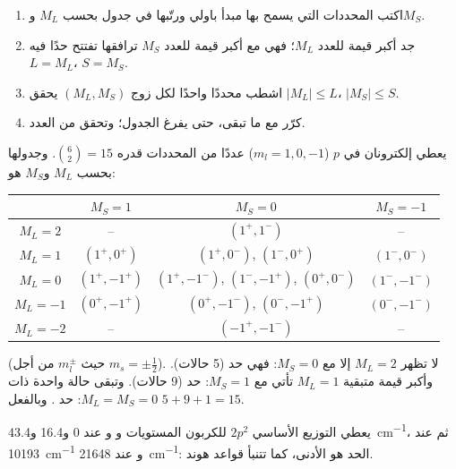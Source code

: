 \begin{method}\label{met:b3:many-electron-atoms:terms}
\begin{enumerate}
  \item اكتب المحددات التي يسمح بها مبدأ باولي ورتّبها
        في جدول بحسب $M_L$ و$M_S$.
  \item جد أكبر قيمة للعدد $M_L$؛ فهي مع أكبر قيمة للعدد $M_S$ ترافقها
        تفتتح حدًا فيه $L = M_L$، $S = M_S$.
  \item اشطب محددًا واحدًا لكل زوج $(M_L, M_S)$ يحقق
        $|M_L| \le L$، $|M_S| \le S$.
  \item كرّر مع ما تبقى، حتى يفرغ الجدول؛ وتحقق من العدد.
\end{enumerate}
\end{method}

\begin{example}[حدود $p^2$]\label{ex:b3:many-electron-atoms:p2}
يعطي إلكترونان في $p$ ($m_l = 1, 0, -1$) عددًا من المحددات قدره $\binom62 = 15$.
وجدولها بحسب $M_L$ و$M_S$ هو:
\begin{center}\small
\begin{tabular}{c|ccc}
\hline
 & $M_S = 1$ & $M_S = 0$ & $M_S = -1$\\ \hline
$M_L = 2$ & -- & $(1^+,1^-)$ & --\\
$M_L = 1$ & $(1^+,0^+)$ & $(1^+,0^-)$, $(1^-,0^+)$ & $(1^-,0^-)$\\
$M_L = 0$ & $(1^+,-1^+)$ & $(1^+,-1^-)$, $(1^-,-1^+)$, $(0^+,0^-)$ & $(1^-,-1^-)$\\
$M_L = -1$ & $(0^+,-1^+)$ & $(0^+,-1^-)$, $(0^-,-1^+)$ & $(0^-,-1^-)$\\
$M_L = -2$ & -- & $(-1^+,-1^-)$ & --\\ \hline
\end{tabular}
\end{center}
(حيث $m_l^\pm$ من أجل $m_s = \pm\frac12$). لا تظهر $M_L = 2$ إلا مع $M_S = 0$:
فهي حد  (5 حالات). وأكبر قيمة متبقية $M_L = 1$ تأتي مع
$M_S = 1$: حد  (9 حالات). وتبقى حالة واحدة ذات $M_L = M_S = 0$: حد
. وبالفعل $5 + 9 + 1 = 15$.
\end{example}

\begin{example}\label{ex:b3:many-electron-atoms:carbon}
يعطي التوزيع الأساسي $2p^2$ للكربون المستويات 
و و عند 0 و16.4 و\qty{43.4}{cm^{-1}}، ثم
 عند \qty{10193}{cm^{-1}} و عند
\qty{21648}{cm^{-1}}: الحد  هو الأدنى، كما تتنبأ قواعد هوند.
\end{example}

